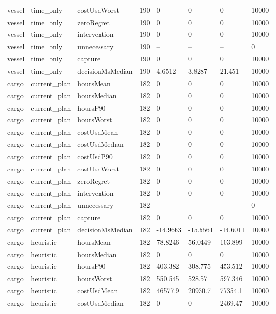 \begin{tabular}{llllllll}
vessel & time\_only & costUsdWorst & 190 & 0 & 0 & 0 & 10000 \\
vessel & time\_only & zeroRegret & 190 & 0 & 0 & 0 & 10000 \\
vessel & time\_only & intervention & 190 & 0 & 0 & 0 & 10000 \\
vessel & time\_only & unnecessary & 190 & -- & -- & -- & 0 \\
vessel & time\_only & capture & 190 & 0 & 0 & 0 & 10000 \\
vessel & time\_only & decisionMsMedian & 190 & 4.6512 & 3.8287 & 21.451 & 10000 \\
cargo & current\_plan & hoursMean & 182 & 0 & 0 & 0 & 10000 \\
cargo & current\_plan & hoursMedian & 182 & 0 & 0 & 0 & 10000 \\
cargo & current\_plan & hoursP90 & 182 & 0 & 0 & 0 & 10000 \\
cargo & current\_plan & hoursWorst & 182 & 0 & 0 & 0 & 10000 \\
cargo & current\_plan & costUsdMean & 182 & 0 & 0 & 0 & 10000 \\
cargo & current\_plan & costUsdMedian & 182 & 0 & 0 & 0 & 10000 \\
cargo & current\_plan & costUsdP90 & 182 & 0 & 0 & 0 & 10000 \\
cargo & current\_plan & costUsdWorst & 182 & 0 & 0 & 0 & 10000 \\
cargo & current\_plan & zeroRegret & 182 & 0 & 0 & 0 & 10000 \\
cargo & current\_plan & intervention & 182 & 0 & 0 & 0 & 10000 \\
cargo & current\_plan & unnecessary & 182 & -- & -- & -- & 0 \\
cargo & current\_plan & capture & 182 & 0 & 0 & 0 & 10000 \\
cargo & current\_plan & decisionMsMedian & 182 & -14.9663 & -15.5561 & -14.6011 & 10000 \\
cargo & heuristic & hoursMean & 182 & 78.8246 & 56.0449 & 103.899 & 10000 \\
cargo & heuristic & hoursMedian & 182 & 0 & 0 & 0 & 10000 \\
cargo & heuristic & hoursP90 & 182 & 403.382 & 308.775 & 453.512 & 10000 \\
cargo & heuristic & hoursWorst & 182 & 550.545 & 528.57 & 597.346 & 10000 \\
cargo & heuristic & costUsdMean & 182 & 46577.9 & 20930.7 & 77354.1 & 10000 \\
cargo & heuristic & costUsdMedian & 182 & 0 & 0 & 2469.47 & 10000 \\

\end{tabular}
